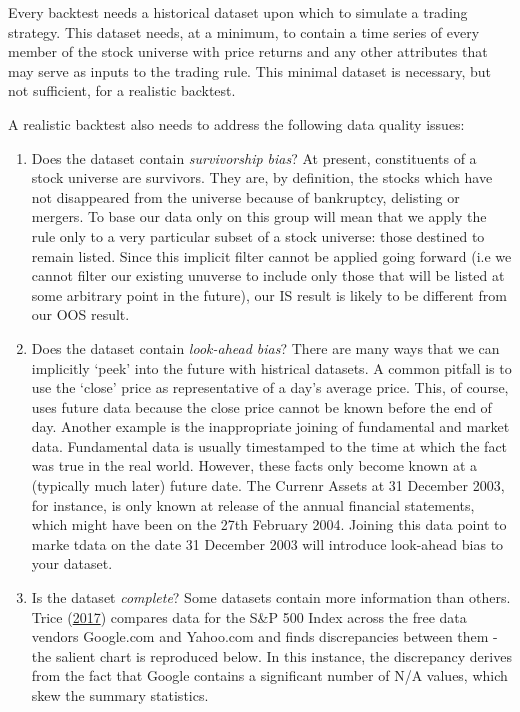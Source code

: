 \documentclass[11pt,preprint, authoryear]{elsarticle}
\numberwithin{equation}{section}
\numberwithin{figure}{section}
\numberwithin{table}{section}
\begin{document}
Every backtest needs a historical dataset upon which to simulate a
trading strategy. This dataset needs, at a minimum, to contain a time
series of every member of the stock universe with price returns and any
other attributes that may serve as inputs to the trading rule. This
minimal dataset is necessary, but not sufficient, for a realistic
backtest.

A realistic backtest also needs to address the following data quality
issues:

\begin{enumerate}
\def\labelenumi{\arabic{enumi})}
\item
  Does the dataset contain \emph{survivorship bias}? At present,
  constituents of a stock universe are survivors. They are, by
  definition, the stocks which have not disappeared from the universe
  because of bankruptcy, delisting or mergers. To base our data only on
  this group will mean that we apply the rule only to a very particular
  subset of a stock universe: those destined to remain listed. Since
  this implicit filter cannot be applied going forward (i.e we cannot
  filter our existing unuverse to include only those that will be listed
  at some arbitrary point in the future), our IS result is likely to be
  different from our OOS result.
\item
  Does the dataset contain \emph{look-ahead bias}? There are many ways
  that we can implicitly `peek' into the future with histrical datasets.
  A common pitfall is to use the `close' price as representative of a
  day's average price. This, of course, uses future data because the
  close price cannot be known before the end of day. Another example is
  the inappropriate joining of fundamental and market data. Fundamental
  data is usually timestamped to the time at which the fact was true in
  the real world. However, these facts only become known at a (typically
  much later) future date. The Currenr Assets at 31 December 2003, for
  instance, is only known at release of the annual financial statements,
  which might have been on the 27th February 2004. Joining this data
  point to marke tdata on the date 31 December 2003 will introduce
  look-ahead bias to your dataset.
\item
  Is the dataset \emph{complete}? Some datasets contain more information
  than others. Trice (\protect\hyperlink{ref-Trice2017}{2017}) compares
  data for the S\&P 500 Index across the free data vendors Google.com
  and Yahoo.com and finds discrepancies between them - the salient chart
  is reproduced below. In this instance, the discrepancy derives from
  the fact that Google contains a significant number of N/A values,
  which skew the summary statistics.
\end{enumerate}
\end{document}
